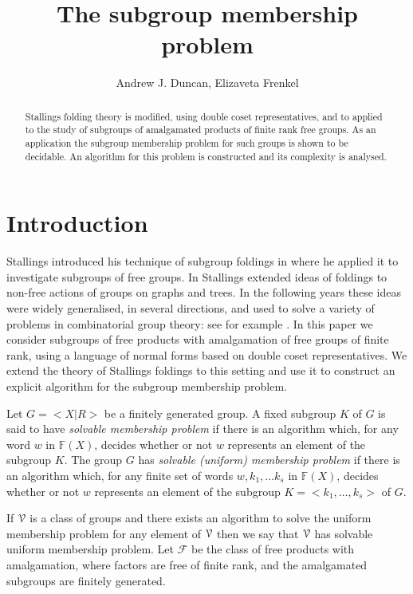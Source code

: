 \documentclass[a4paper,12pt]{article}
\title{The subgroup membership problem
}
\author{Andrew J. Duncan, Elizaveta Frenkel}
\newcommand{\cF}{{\cal{F}}}
\newcommand{\cV}{{\cal{V}}}
\numberwithin{equation}{section}
\numberwithin{figure}{section}
\newcommand{\FF}{\ensuremath{\mathbb{F}}}
\renewcommand{\cF}{\mathcal{F}}
\begin{document}
\maketitle

\begin{abstract}
Stallings folding theory is modified, using double coset representatives, and to applied
to the study of subgroups of  amalgamated
products of finite rank free groups. As an application the
 subgroup membership
problem for such groups is shown to be decidable. An algorithm for this
problem is constructed and its complexity is analysed.
 \end{abstract}



\section{Introduction}\label{se:global_intro}

Stallings introduced his technique of subgroup foldings in
\cite{stallings83} where he applied it to investigate subgroups of
free groups. In \cite{stallings88} Stallings extended ideas of
foldings to non-free actions of groups on graphs and trees. In the following
years these ideas were widely generalised, in several
directions,  and used to solve a variety of  problems in
combinatorial group theory: see for example
\cite{befe,BoWei,KM02,SilvaWeil08}.
In this paper we consider  subgroups
of free products with amalgamation of free groups of finite rank, using
a language of normal forms based on double coset representatives.  We
extend the theory  of Stallings foldings to this setting and use it to construct an
explicit algorithm for the subgroup membership problem.

Let $G = <X|R>$ be a finitely generated group.
A fixed subgroup $K$ of $G$ is said to have
\emph{solvable  membership problem} if there is an algorithm which, for
any word $w$ in $\FF(X)$, decides
whether or not $w$ represents an element of  the subgroup $K$.
The group $G$ has
\emph{solvable  (uniform) membership problem} if there is an algorithm which, for
any finite set of words $w, k_1, \ldots k_s$ in $\FF(X)$, decides
whether or not $w$ represents an element of  the subgroup $K = <k_1,
\ldots, k_s>$ of $G$.


If $\cV$ is a class of groups and there exists an algorithm to
solve the uniform membership problem for any element of $\cV$ then
we say that $\cV$ has solvable uniform  membership problem.
Let $\cF$ be the class of free products with amalgamation, where
factors are free of finite rank, and the amalgamated subgroups are
finitely generated.
\end{document}
